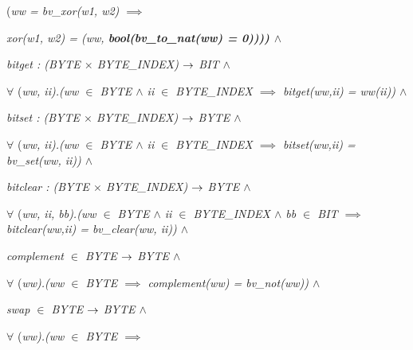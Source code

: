 \begin{sloppypar}
\hspace*{0.40in}\rm (\it ww \rm = \it bv\_xor\rm (\it w1\rm , \it w2\rm )  $\implies$ 

\hspace*{0.60in}\it xor\rm (\it w1\rm , \it w2\rm ) \rm = \rm (\it ww\rm , \bf bool\rm (\it bv\_to\_nat\rm (\it ww\rm ) \rm = \rm 0\rm )\rm )\rm )\rm )  $\land$  

\hspace*{0.20in}\it bitget \rm : \rm (\it BYTE  $\times$  \it BYTE\_INDEX\rm )  $\rightarrow$  \it BIT  $\land$  

\hspace*{0.20in} $\forall$  \rm (\it ww\rm , \it ii\rm )\rm .\rm (\it ww  $\in$  \it BYTE  $\land$  \it ii  $\in$  \it BYTE\_INDEX  $\implies$  \it bitget\rm (\it ww\rm ,\it ii\rm ) \rm = \it ww\rm (\it ii\rm )\rm )  $\land$  

\hspace*{0.20in}\it bitset \rm : \rm (\it BYTE  $\times$  \it BYTE\_INDEX\rm )  $\rightarrow$  \it BYTE  $\land$  

\hspace*{0.20in} $\forall$  \rm (\it ww\rm , \it ii\rm )\rm .\rm (\it ww  $\in$  \it BYTE  $\land$  \it ii  $\in$  \it BYTE\_INDEX  $\implies$  \it bitset\rm (\it ww\rm ,\it ii\rm ) \rm = \it bv\_set\rm (\it ww\rm , \it ii\rm )\rm )  $\land$  

\hspace*{0.20in}\it bitclear \rm : \rm (\it BYTE  $\times$  \it BYTE\_INDEX\rm )  $\rightarrow$  \it BYTE  $\land$  

\hspace*{0.20in} $\forall$  \rm (\it ww\rm , \it ii\rm , \it bb\rm )\rm .\rm (\it ww  $\in$  \it BYTE  $\land$  \it ii  $\in$  \it BYTE\_INDEX  $\land$  \it bb  $\in$  \it BIT  $\implies$  \it bitclear\rm (\it ww\rm ,\it ii\rm ) \rm = \it bv\_clear\rm (\it ww\rm , \it ii\rm )\rm )  $\land$  

\hspace*{0.20in}\it complement  $\in$  \it BYTE  $\rightarrow$  \it BYTE  $\land$  

\hspace*{0.20in} $\forall$  \rm (\it ww\rm )\rm .\rm (\it ww  $\in$  \it BYTE  $\implies$  \it complement\rm (\it ww\rm ) \rm = \it bv\_not\rm (\it ww\rm )\rm )  $\land$  

\hspace*{0.20in}\it swap  $\in$  \it BYTE  $\rightarrow$  \it BYTE  $\land$  

\hspace*{0.20in} $\forall$  \rm (\it ww\rm )\rm .\rm (\it ww  $\in$  \it BYTE  $\implies$ 


\end{sloppypar}
